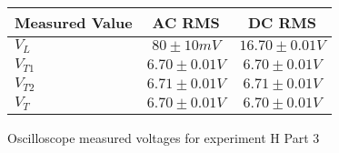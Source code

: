 \begin{figure}[H]    \centering    \begin{tabular}{|l|c|c|}
        \hline
        Measured Value & AC RMS & DC RMS \\
        \hline
        $V_{L}$ & $80\pm 10\unit{mV}$ & $16.70\pm 0.01\unit{V}$ \\
        $V_{T1}$ & $6.70\pm 0.01\unit{V}$ & $6.70\pm 0.01\unit{V}$ \\
        $V_{T2}$ & $6.71\pm 0.01\unit{V}$ & $6.71\pm 0.01\unit{V}$ \\
        $V_{T}$ & $6.70\pm 0.01\unit{V}$ & $6.70\pm 0.01\unit{V}$ \\
        \hline
    \end{tabular}    \caption{Oscilloscope measured voltages for experiment H Part 3}\end{figure}